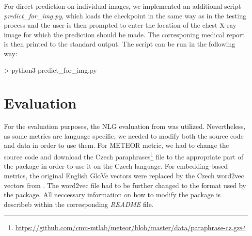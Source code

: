 For direct prediction on individual images, we implemented an additional script \textit{predict\_for\_img.py}, which loads the checkpoint in the same way as in the testing process and the user is then prompted to enter the location of the chest X-ray image for which the prediction should be made. The corresponing medical report is then printed to the standard output. The script can be run in the following way:
\begin{code}
> python3 predict_for_img.py
\end{code}

\section{Evaluation}
For the evaluation purposes, the NLG evaluation from \citet{sharma2017nlgeval} was utilized. Nevertheless, as some metrics are language specific, we needed to modify both the source code and data in order to use them. For METEOR metric, we had to change the source code and download the Czech paraphrases\footnote[6]{\url{https://github.com/cmu-mtlab/meteor/blob/master/data/paraphrase-cz.gz}} file to the appropriate part of the package in order to use it on the Czech language. For embedding-based metrics, the original English GloVe vectors were replaced by the Czech word2vec vectors from \citet{grave2018learning}. The word2vec file had to be further changed to the format used by the package. All neccessary information on how to modify the package is describeb within the corresponding \textit{README} file.
